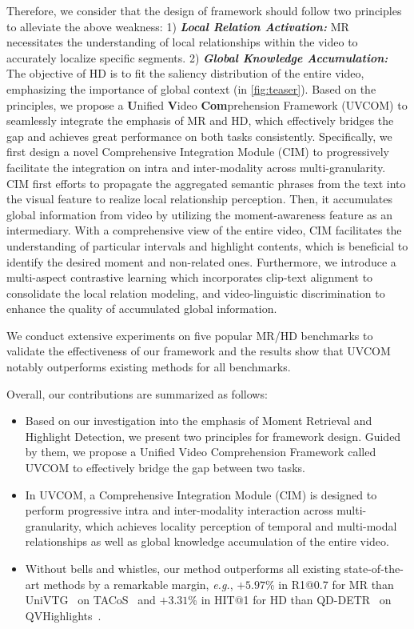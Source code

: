 Therefore, we consider that the design of framework should follow two principles to alleviate the above weakness: 1) \textit{\textbf{Local Relation Activation:}} MR necessitates the understanding of local relationships within the video to accurately localize specific segments. 2) \textit{\textbf{Global Knowledge Accumulation:}} The objective of HD is to fit the saliency distribution of the entire video, emphasizing the importance of global context (in \cref{fig:teaser}). Based on the principles, we propose a \textbf{U}nified \textbf{V}ideo \textbf{Com}prehension Framework (UVCOM) to seamlessly integrate the emphasis of MR and HD, which effectively bridges the gap and achieves great performance on both tasks consistently. 
Specifically, we first design a novel Comprehensive Integration Module (CIM) to progressively facilitate the integration on intra and inter-modality across multi-granularity.
CIM first efforts to propagate the aggregated semantic phrases from the text into the visual feature to realize local relationship perception.
Then, it accumulates global information from video by utilizing the moment-awareness feature as an intermediary.
With a comprehensive view of the entire video, CIM facilitates the understanding of particular intervals and highlight contents, which is beneficial to identify the desired moment and non-related ones. 
Furthermore, we introduce a multi-aspect contrastive learning which incorporates clip-text alignment to consolidate the local relation modeling, and video-linguistic discrimination to enhance the quality of accumulated global information.

We conduct extensive experiments on five popular MR/HD benchmarks  
to validate the effectiveness of our framework and the results show that UVCOM notably outperforms existing methods for all benchmarks.

Overall, our contributions are summarized as follows:
\begin{itemize}
    \item Based on our investigation into the emphasis of Moment Retrieval and Highlight Detection, we present two principles for framework design. Guided by them, we propose a Unified Video Comprehension Framework called UVCOM to effectively bridge the gap between two tasks.
    \item In UVCOM, a Comprehensive Integration Module (CIM) is designed to perform progressive intra and inter-modality interaction across multi-granularity, which achieves locality perception of temporal and multi-modal relationships as well as global knowledge accumulation of the entire video.
    \item Without bells and whistles, our method outperforms all existing state-of-the-art methods by a remarkable margin, \textit{e.g.}, $+5.97$\% in R1@0.7 for MR than UniVTG~\cite{univtg} on TACoS~\cite{tacos} and $+3.31$\% in HIT@1 for HD than QD-DETR~\cite{qddetr} on QVHighlights~\cite{momentdetr}.
\end{itemize}

